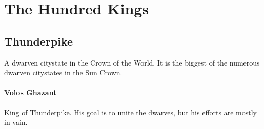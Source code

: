 \documentclass[../main.tex]{subfiles}
\begin{document}
\section{The Hundred Kings}	%

\subsection{Thunderpike}
A dwarven citystate in the Crown of the World. It is the
biggest of the numerous dwarven citystates in the
Sun Crown.

\paragraph{Volos Ghazant}
King of Thunderpike. His goal is to unite the dwarves, but
his efforts are mostly in vain.
\end{document}
